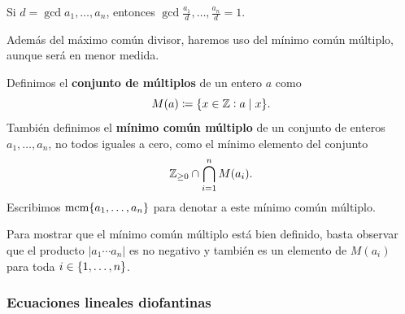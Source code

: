 \begin{lemma}
	\label{prerreq:lemma:gcd}
	Si $d = \gcd{a_1, \ldots, a_n}$, entonces $\gcd{\frac{a_1}{d}, \ldots, \frac{a_n}{d}} = 1$.
\end{lemma}

Además del máximo común divisor, haremos uso del mínimo común múltiplo, aunque será en menor medida.
\begin{definition}
	Definimos el \textbf{conjunto de múltiplos} de un entero $a$ como
	\begin{equation*}
		M(a) \coloneq \lbrace x \in \mathbb{Z} \vcentcolon a \mid x \rbrace.
	\end{equation*}
	También definimos el \textbf{mínimo común múltiplo} de un conjunto de enteros $a_1, \ldots,
	a_n$, no todos iguales a cero, como el mínimo elemento del conjunto
	\begin{equation*}
		\mathbb{Z}_{\geq 0} \cap \bigcap_{i=1}^{n}M(a_i).
	\end{equation*}
	Escribimos $\mathop{\mathrm{mcm}{\left\lbrace a_1, \ldots, a_n \right\rbrace}}$ para denotar a este mínimo común múltiplo.
\end{definition}


Para mostrar que el mínimo común múltiplo está bien definido, basta observar que el producto $|a_1
\cdots a_n|$ es no negativo y también es un elemento de $M(a_i)$ para toda $i \in \lbrace 1, \ldots,
n \rbrace$.

\subsubsection{Ecuaciones lineales diofantinas}

